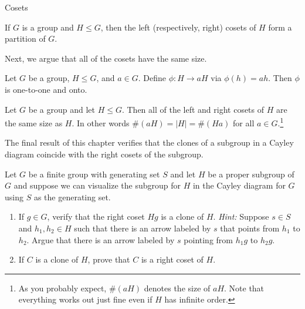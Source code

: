 \begin{section}{Cosets}
\begin{corollary}
If $G$ is a group and $H\leq G$, then the left (respectively, right) cosets of $H$ form a partition of $G$.
\end{corollary}

Next, we argue that all of the cosets have the same size.

\begin{theorem}
Let $G$ be a group, $H\leq G$, and $a\in G$.  Define $\phi:H\to aH$ via $\phi(h)=ah$.  Then $\phi$ is one-to-one and onto.
\end{theorem}

\begin{corollary}\label{cor:cosets_same_size}
Let $G$ be a group and let $H\leq G$.  Then all of the left and right cosets of $H$ are the same size as $H$.  In other words $\#(aH)=|H|=\#(Ha)$ for all $a\in G$.\footnote{As you probably expect, $\#(aH)$ denotes the size of $aH$. Note that everything works out just fine even if $H$ has infinite order.}
\end{corollary}

The final result of this chapter verifies that the clones of a subgroup in a Cayley diagram coincide with the right cosets of the subgroup.

\begin{problem}\label{prob:RightCosetsClones}
Let $G$ be a finite group with generating set $S$ and let $H$ be a proper subgroup of $G$ and suppose we can visualize the subgroup for $H$ in the Cayley diagram for $G$ using $S$ as the generating set. 
\begin{enumerate}[label=\rm{(\alph*)}]
\item If $g\in G$, verify that the right coset $Hg$ is a clone of $H$. \emph{Hint:} Suppose $s\in S$ and $h_1, h_2\in H$ such that there is an arrow labeled by $s$ that points from $h_1$ to $h_2$.  Argue that there is an arrow labeled by $s$ pointing from $h_1g$ to $h_2g$.
\item If $C$ is a clone of $H$, prove that $C$ is a right coset of $H$.
\end{enumerate}
\end{problem}

\end{section}

